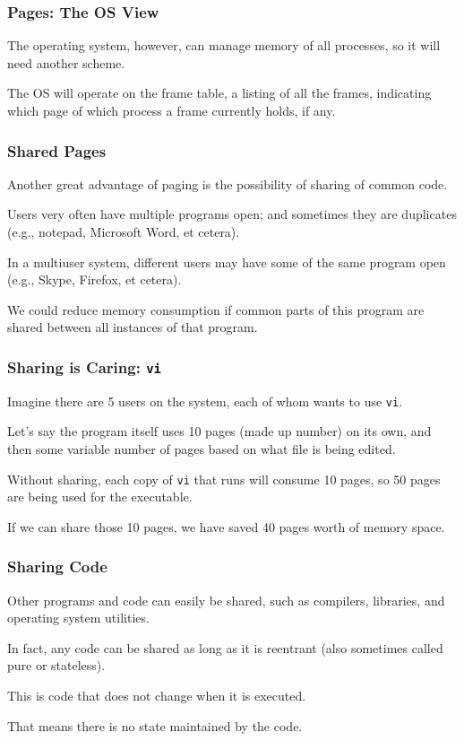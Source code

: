 \begin{frame}
\frametitle{Pages: The OS View}

The operating system, however, can manage memory of all processes, so it will need another scheme. 

The OS will operate on the \alert{frame table}, a listing of all the frames, indicating which page of which process a frame currently holds, if any.


\end{frame}

\begin{frame}
\frametitle{Shared Pages}

Another great advantage of paging is the possibility of sharing of common code. 

Users very often have multiple programs open; and sometimes they are duplicates (e.g., notepad, Microsoft Word, et cetera). 

In a multiuser system, different users may have some of the same program open (e.g., Skype, Firefox, et cetera). 

We could reduce memory consumption if common parts of this program are shared between all instances of that program.

\end{frame}


\begin{frame}
\frametitle{Sharing is Caring: \texttt{vi}}

Imagine there are 5 users on the system, each of whom wants to use \texttt{vi}. 

Let's say the program itself uses 10 pages (made up number) on its own, and then some variable number of pages based on what file is being edited. 

Without sharing, each copy of \texttt{vi} that runs will consume 10 pages, so 50 pages are being used for the executable. 

If we can share those 10 pages, we have saved 40 pages worth of memory space.


\end{frame}

\begin{frame}
\frametitle{Sharing Code}

Other programs and code can easily be shared, such as compilers, libraries, and operating system utilities. 

In fact, any code can be shared as long as it is \alert{reentrant} (also sometimes called pure or stateless). 

This is code that does not change when it is executed. 

That means there is no state maintained by the code. 


\end{frame}

